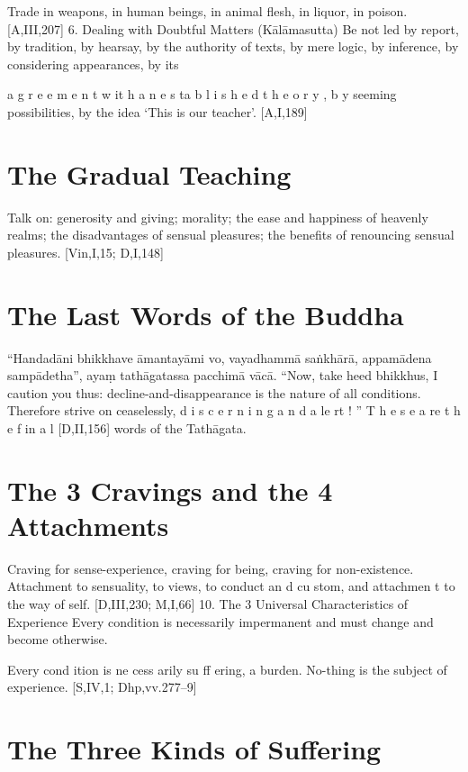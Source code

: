 Trade in weapons, in human beings, in animal
flesh, in liquor, in poison.
[A,III,207]
6. Dealing with Doubtful Matters (Kālāmasutta)
Be not led by report, by tradition, by hearsay,
by the authority of texts, by mere logic, by
inference, by considering appearances, by its

a g r e e m e n t w it h a n e s ta b l i s h e d t h e o r y , b y
seeming possibilities, by the idea ‘This is our
teacher’.
[A,I,189]

\section{The Gradual Teaching}

Talk on: generosity and giving; morality; the
ease and happiness of heavenly realms; the disadvantages of sensual pleasures; the benefits of
renouncing sensual pleasures.
[Vin,I,15; D,I,148]

\section{The Last Words of the Buddha}

“Handadāni bhikkhave āmantayāmi vo,
vayadhammā saṅkhārā,
appamādena sampādetha”,
ayaṃ tathāgatassa pacchimā vācā.
“Now, take heed bhikkhus, I caution you thus:
decline-and-disappearance is the nature of all
conditions. Therefore strive on ceaselessly,
d i s c e r n i n g a n d a le rt ! ” T h e s e a re t h e f in a l
[D,II,156]
words of the Tathāgata.

\section{The 3 Cravings and the 4 Attachments}

Craving for sense-experience, craving for
being, craving for non-existence.
Attachment to sensuality, to views, to conduct
an d cu stom, and attachmen t to the way of
self.
[D,III,230; M,I,66]
10. The 3 Universal Characteristics of Experience
Every condition is necessarily impermanent
and must change and become otherwise.

Every cond ition is ne cess arily su ff ering, a
burden.
No-thing is the subject of experience.
[S,IV,1; Dhp,vv.277–9]

\section{The Three Kinds of Suffering}

